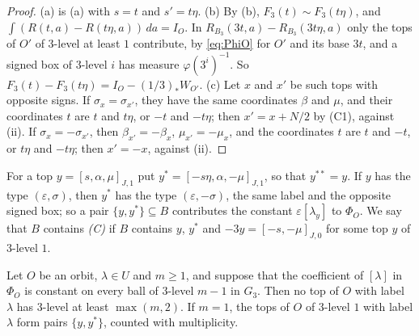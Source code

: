\begin{proof}
(a) is (a) with $s=t$ and $s'=t\eta$. (b) By
(b), $F_{3}(t)\sim F_{3}(t\eta)$, and $\int(R(t,a)-
R(t\eta,a))\,da=I_{O}$. In $R_{B_{3}}(3t,a)-R_{B_{3}}(3t\eta,a)$ only the tops
of $O'$ of $3$-level at least $1$ contribute, by \eqref{eq:PhiO} for $O'$
and its base $3t$, and a signed box of $3$-level $i$ has measure
$\varphi(3^{i})^{-1}$. So $F_{3}(t)-F_{3}(t\eta)=I_{O}-(1/3)_{*}W_{O'}$.
(c) Let $x$ and $x'$ be such tops with opposite signs. If
$\sigma_{x}=\sigma_{x'}$, they have the same coordinates $\beta$ and $\mu$,
and their coordinates $t$ are $t$ and $t\eta$, or $-t$ and $-t\eta$; then
$x'=x+N/2$ by (C1), against (ii). If
$\sigma_{x}=-\sigma_{x'}$, then $\beta_{x'}=-\beta_{x}$, $\mu_{x'}=-\mu_{x}$,
and the coordinates $t$ are $t$ and $-t$, or $t\eta$ and $-t\eta$; then
$x'=-x$, against (ii).
\end{proof}

For a top $y=[s,\alpha,\mu]_{J,1}$ put $y^{*}=[-s\eta,\alpha,-\mu]_{J,1}$,
so that $y^{**}=y$. If $y$ has the type $(\varepsilon,\sigma)$, then $y^{*}$
has the type $(\varepsilon,-\sigma)$, the same label and the opposite signed
box; so a pair $\{y,y^{*}\}\subseteq B$ contributes the constant
$\varepsilon[\lambda_{y}]$ to $\Phi_{O}$. We say that $B$ contains
\emph{\textup{(C)}} if $B$ contains $y$, $y^{*}$ and $-3y=[-s,-\mu]_{J,0}$
for some top $y$ of $3$-level $1$.

\begin{lemma}\label{lem:flat}
Let $O$ be an orbit, $\lambda\in U$ and $m\ge1$, and suppose that the
coefficient of $[\lambda]$ in $\Phi_{O}$ is constant on every ball of
$3$-level $m-1$ in $G_{3}$. Then no top of $O$ with label $\lambda$ has
$3$-level at least $\max(m,2)$. If $m=1$, the tops of $O$ of $3$-level $1$
with label $\lambda$ form pairs $\{y,y^{*}\}$, counted with multiplicity.
\end{lemma}

